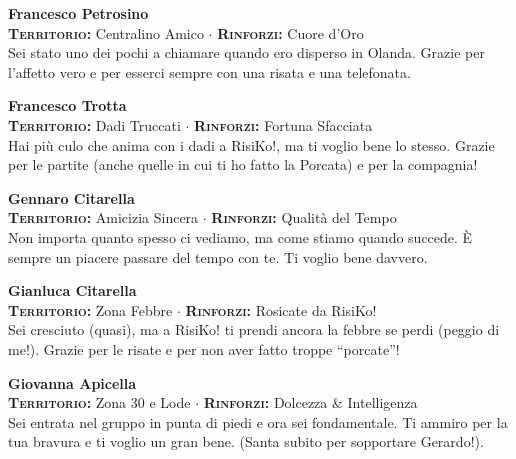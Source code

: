 \noindent\begin{minipage}{\linewidth}
\textbf{Francesco Petrosino} \\
{\footnotesize \textbf{\textsc{Territorio:}} Centralino Amico $\cdot$ \textbf{\textsc{Rinforzi:}} Cuore d'Oro} \\
Sei stato uno dei pochi a chiamare quando ero disperso in Olanda. Grazie per l'affetto vero e per esserci sempre con una risata e una telefonata.
\end{minipage}
\vspace{0.6cm}

\noindent\begin{minipage}{\linewidth}
\textbf{Francesco Trotta} \\
{\footnotesize \textbf{\textsc{Territorio:}} Dadi Truccati $\cdot$ \textbf{\textsc{Rinforzi:}} Fortuna Sfacciata} \\
Hai più culo che anima con i dadi a RisiKo!, ma ti voglio bene lo stesso. Grazie per le partite (anche quelle in cui ti ho fatto la Porcata) e per la compagnia!
\end{minipage}
\vspace{0.6cm}

\noindent\begin{minipage}{\linewidth}
\textbf{Gennaro Citarella} \\
{\footnotesize \textbf{\textsc{Territorio:}} Amicizia Sincera $\cdot$ \textbf{\textsc{Rinforzi:}} Qualità del Tempo} \\
Non importa quanto spesso ci vediamo, ma come stiamo quando succede. È sempre un piacere passare del tempo con te. Ti voglio bene davvero.
\end{minipage}
\vspace{0.6cm}

\noindent\begin{minipage}{\linewidth}
\textbf{Gianluca Citarella} \\
{\footnotesize \textbf{\textsc{Territorio:}} Zona Febbre $\cdot$ \textbf{\textsc{Rinforzi:}} Rosicate da RisiKo!} \\
Sei cresciuto (quasi), ma a RisiKo! ti prendi ancora la febbre se perdi (peggio di me!). Grazie per le risate e per non aver fatto troppe ``porcate''!
\end{minipage}
\vspace{0.6cm}

\noindent\begin{minipage}{\linewidth}
\textbf{Giovanna Apicella} \\
{\footnotesize \textbf{\textsc{Territorio:}} Zona 30 e Lode $\cdot$ \textbf{\textsc{Rinforzi:}} Dolcezza \& Intelligenza} \\
Sei entrata nel gruppo in punta di piedi e ora sei fondamentale. Ti ammiro per la tua bravura e ti voglio un gran bene. (Santa subito per sopportare Gerardo!).
\end{minipage}
\vspace{0.6cm}

